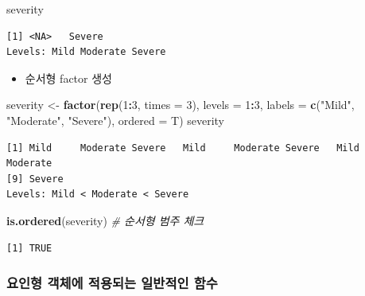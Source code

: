 \documentclass[
  11pt,
]{krantz}
\newenvironment{Shaded}{\begin{snugshade}}{\end{snugshade}}
\newcommand{\CommentTok}[1]{\textcolor[rgb]{0.37,0.37,0.37}{\textit{#1}}}
\newcommand{\DataTypeTok}[1]{\textcolor[rgb]{0.27,0.27,0.27}{#1}}
\newcommand{\DecValTok}[1]{\textcolor[rgb]{0.06,0.06,0.06}{#1}}
\newcommand{\KeywordTok}[1]{\textcolor[rgb]{0.27,0.27,0.27}{\textbf{#1}}}
\newcommand{\NormalTok}[1]{#1}
\newcommand{\OperatorTok}[1]{\textcolor[rgb]{0.43,0.43,0.43}{\textbf{#1}}}
\newcommand{\StringTok}[1]{\textcolor[rgb]{0.5,0.5,0.5}{#1}}
\providecommand{\tightlist}{%
  \setlength{\itemsep}{0pt}\setlength{\parskip}{0pt}}
\begin{document}
\begin{Shaded}
\begin{Highlighting}[]
\NormalTok{severity}
\end{Highlighting}
\end{Shaded}

\begin{verbatim}
[1] <NA>   Severe
Levels: Mild Moderate Severe
\end{verbatim}

\normalsize

\begin{itemize}
\tightlist
\item
  순서형 factor 생성
\end{itemize}

\footnotesize

\begin{Shaded}
\begin{Highlighting}[]
\NormalTok{severity <-}\StringTok{ }\KeywordTok{factor}\NormalTok{(}\KeywordTok{rep}\NormalTok{(}\DecValTok{1}\OperatorTok{:}\DecValTok{3}\NormalTok{, }\DataTypeTok{times =} \DecValTok{3}\NormalTok{), }\DataTypeTok{levels =} \DecValTok{1}\OperatorTok{:}\DecValTok{3}\NormalTok{, }
                   \DataTypeTok{labels =} \KeywordTok{c}\NormalTok{(}\StringTok{"Mild"}\NormalTok{, }\StringTok{"Moderate"}\NormalTok{, }\StringTok{"Severe"}\NormalTok{), }
                   \DataTypeTok{ordered =}\NormalTok{ T)}
\NormalTok{severity}
\end{Highlighting}
\end{Shaded}

\begin{verbatim}
[1] Mild     Moderate Severe   Mild     Moderate Severe   Mild     Moderate
[9] Severe  
Levels: Mild < Moderate < Severe
\end{verbatim}

\begin{Shaded}
\begin{Highlighting}[]
\KeywordTok{is.ordered}\NormalTok{(severity) }\CommentTok{# 순서형 범주 체크}
\end{Highlighting}
\end{Shaded}

\begin{verbatim}
[1] TRUE
\end{verbatim}

\normalsize

\hypertarget{factor-generic-fun}{%
\subsubsection*{요인형 객체에 적용되는 일반적인 함수}\label{factor-generic-fun}}
\end{document}
